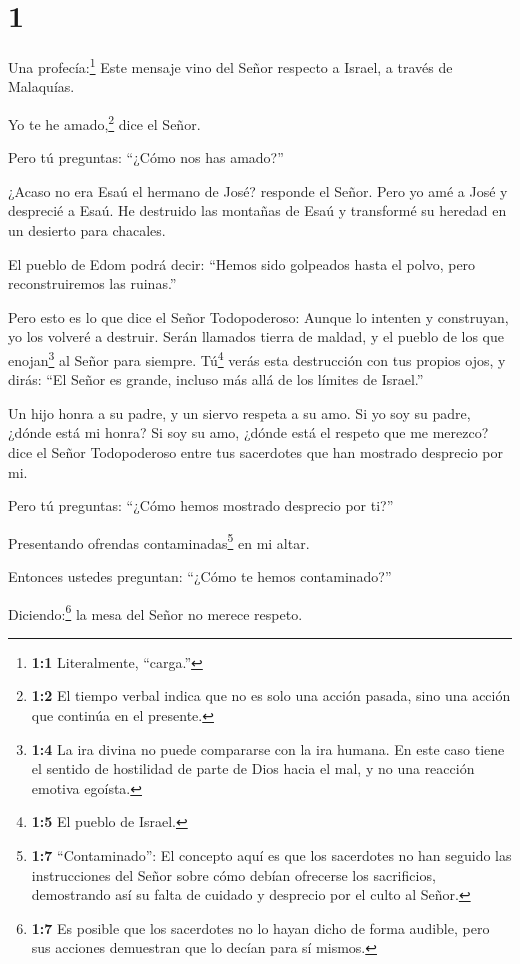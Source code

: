 \hypertarget{section}{%
\section{1}\label{section}}

 Una profecía:\footnote{\textbf{1:1} Literalmente,
  ``carga.''} Este mensaje vino del Señor respecto a Israel, a través de
Malaquías.

 Yo te he amado,\footnote{\textbf{1:2} El tiempo verbal
  indica que no es solo una acción pasada, sino una acción que continúa
  en el presente.} dice el Señor.

Pero tú preguntas: ``¿Cómo nos has amado?''

¿Acaso no era Esaú el hermano de José? responde el Señor. Pero yo amé a
José  y desprecié a Esaú. He destruido las montañas de Esaú
y transformé su heredad en un desierto para chacales.

 El pueblo de Edom podrá decir: ``Hemos sido golpeados hasta
el polvo, pero reconstruiremos las ruinas.''

Pero esto es lo que dice el Señor Todopoderoso: Aunque lo intenten y
construyan, yo los volveré a destruir. Serán llamados tierra de maldad,
y el pueblo de los que enojan\footnote{\textbf{1:4} La ira divina no
  puede compararse con la ira humana. En este caso tiene el sentido de
  hostilidad de parte de Dios hacia el mal, y no una reacción emotiva
  egoísta.} al Señor para siempre.  Tú\footnote{\textbf{1:5}
  El pueblo de Israel.} verás esta destrucción con tus propios ojos, y
dirás: ``El Señor es grande, incluso más allá de los límites de
Israel.''

 Un hijo honra a su padre, y un siervo respeta a su amo. Si
yo soy su padre, ¿dónde está mi honra? Si soy su amo, ¿dónde está el
respeto que me merezco? dice el Señor Todopoderoso entre tus sacerdotes
que han mostrado desprecio por mi.

Pero tú preguntas: ``¿Cómo hemos mostrado desprecio por ti?''

 Presentando ofrendas contaminadas\footnote{\textbf{1:7}
  ``Contaminado'': El concepto aquí es que los sacerdotes no han seguido
  las instrucciones del Señor sobre cómo debían ofrecerse los
  sacrificios, demostrando así su falta de cuidado y desprecio por el
  culto al Señor.} en mi altar.

Entonces ustedes preguntan: ``¿Cómo te hemos contaminado?''

Diciendo:\footnote{\textbf{1:7} Es posible que los sacerdotes no lo
  hayan dicho de forma audible, pero sus acciones demuestran que lo
  decían para sí mismos.} la mesa del Señor no merece respeto.

